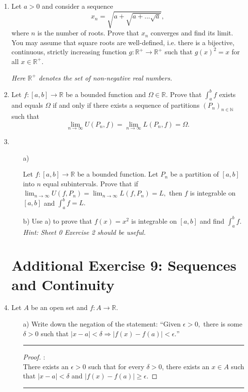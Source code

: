 \documentclass[openany, amssymb, psamsfonts]{amsart}
\newcommand{\bbN}{\mathbb{N}}
\newcommand{\bbR}{\mathbb{R}}
\theoremstyle{definition}
\numberwithin{equation}{section}
\begin{document}
\begin{enumerate}
\item
 Let $a>0$ and consider a sequence 
$$
x_n=\sqrt{a+\sqrt{a+...\sqrt{a}}},
$$
where $n$ is the number of roots. Prove that $x_n$ converges and find its limit. You may assume that square roots are well-defined, i.e. there is a bijective, continuous, strictly increasing 
function $g:\bbR^{+}\to \bbR^{+}$ such that $g(x)^2=x$ for all $x\in \bbR^{+}.$

{\em Here $\bbR^{+}$ denotes the set of non-negative real numbers.}





\item Let $f:[a,b]\to\bbR$ be a bounded function and $\Omega\in\bbR$. Prove that $\int_a^b f$ exists and equals $\Omega$ if and only if there  exists a sequence of partitions $(P_n)_{n\in\bbN}$ such that
$$\lim_{n\to\infty} U(P_n,f)=\lim_{n\to\infty} L(P_n,f)=\Omega.$$


\item
\begin{enumerate}
\item[a)] 

Let $f:[a,b]\longrightarrow \bbR$ be a bounded function. Let $P_n$ be a partition of $[a,b]$ into $n$ equal subintervals. Prove that
if $\displaystyle \lim_{n\longrightarrow\infty} U(f,P_n)=\displaystyle\lim_{n\longrightarrow\infty} L(f,P_n)=L,$ then
$f$ is integrable on $[a,b]$ and $\int _a^b f=L.$


\item[b)] Use a) to prove that $f(x)=x^2$ is integrable on $[a,b]$ and find $\int_a^b f.$ 
{\em Hint: Sheet 0 Exercise 2 should be useful.}
 \end{enumerate}

 
 \section*{Additional Exercise 9: Sequences and Continuity}
 \item Let $A$ be an open set and $f\colon A\to \bbR.$ 
\begin{enumerate}
\item[a)] Write down the negation of the statement:
``Given $\epsilon>0,$ there is some $\delta>0$ such that $|x-a|<\delta\Longrightarrow |f(x)-f(a)|<\epsilon.$''
\vspace{4pt}     \hrule   \vspace{4pt}\begin{proof}:\\
There exists an  $\epsilon > 0$ such that for every  $\delta > 0$, there exists an $ x\in A$ such that $|x - a| < \delta$ and $|f(x) - f(a)| \geq \epsilon$.
\end{proof}\vspace{4pt}     \hrule   \vspace{4pt}



\end{enumerate}
\end{enumerate}
\end{document}
